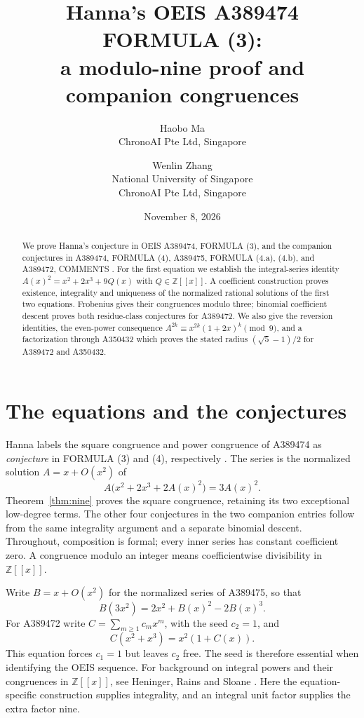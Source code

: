 \documentclass[11pt]{article}
\title{Hanna's OEIS A389474 FORMULA (3):\\
a modulo-nine proof and companion congruences}
\author{Haobo Ma\\\small ChronoAI Pte Ltd, Singapore
\and Wenlin Zhang\\\small National University of Singapore\\
\small ChronoAI Pte Ltd, Singapore}
\date{November 8, 2026}
\newcommand{\Z}{\mathbb Z}
\begin{document}
\maketitle
\begin{abstract}
We prove Hanna's conjecture in OEIS A389474, FORMULA (3), and the
companion conjectures in A389474, FORMULA (4),
A389475, FORMULA (4.a), (4.b), and A389472, COMMENTS
\cite{h474,h475,h472}.
For the first equation we establish the integral-series identity
$A(x)^2=x^2+2x^3+9Q(x)$ with $Q\in\Z[[x]]$.
A coefficient construction proves existence, integrality and uniqueness of
the normalized rational solutions of the first two equations.
Frobenius gives their congruences modulo three; binomial coefficient descent
proves both residue-class conjectures for A389472.
We also give the reversion identities, the even-power consequence
$A^{2k}\equiv x^{2k}(1+2x)^k\pmod 9$, and a factorization through
A350432 which proves the stated radius $(\sqrt5-1)/2$ for A389472
and A350432.
\end{abstract}

\section{The equations and the conjectures}

Hanna labels the square congruence and power congruence of
A389474 as \emph{conjecture} in FORMULA (3) and (4), respectively
\cite{h474}. The series is the normalized solution
$A=x+O(x^2)$ of
\begin{equation}\label{eq:A}
 A\bigl(x^2+2x^3+2A(x)^2\bigr)=3A(x)^2.
\end{equation}
Theorem~\ref{thm:nine} proves the square congruence, retaining its
two exceptional low-degree terms. The other four conjectures in the two
companion entries follow from the same integrality argument and a separate
binomial descent. Throughout, composition is formal; every inner series
has constant coefficient zero. A congruence modulo an integer means
coefficientwise divisibility in $\Z[[x]]$.

Write $B=x+O(x^2)$ for the normalized series of A389475, so that
\begin{equation}\label{eq:B}
 B(3x^2)=2x^2+B(x)^2-2B(x)^3.
\end{equation}
For A389472 write $C=\sum_{m\ge1}c_mx^m$, with the seed $c_2=1$, and
\begin{equation}\label{eq:C}
 C(x^2+x^3)=x^2(1+C(x)).
\end{equation}
This equation forces $c_1=1$ but leaves $c_2$ free. The seed is therefore
essential when identifying the OEIS sequence.
For background on integral powers and their congruences in
$\Z[[x]]$, see Heninger, Rains and Sloane \cite[Theorems 1 and 16]{hrs}.
Here the equation-specific construction supplies integrality, and an
integral unit factor supplies the extra factor nine.
\end{document}
